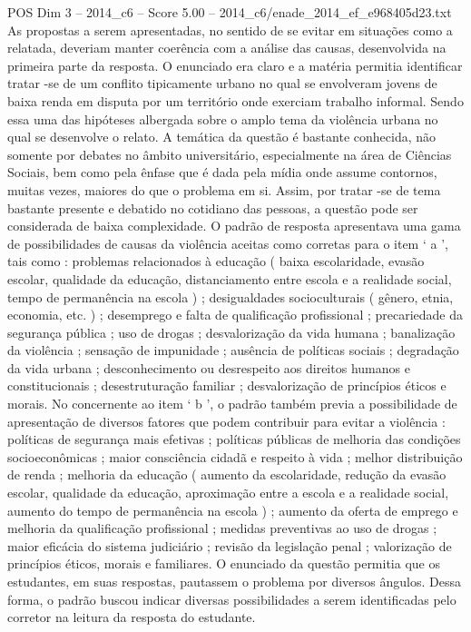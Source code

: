 \begin{textsample}{POS Dim 3 – 2014\_c6 – Score 5.00 – 2014\_c6/enade\_2014\_ef\_e968405d23.txt}
As propostas a serem apresentadas, no sentido de se evitar em situações como a relatada, deveriam manter coerência com a análise das causas, desenvolvida na primeira parte da resposta.
O enunciado era claro e a matéria permitia identificar tratar -se de um conflito tipicamente urbano no qual se envolveram jovens de baixa renda em disputa por um território onde exerciam trabalho informal.
Sendo essa uma das hipóteses albergada sobre o amplo tema da violência urbana no qual se desenvolve o relato.
A temática da questão é bastante conhecida, não somente por debates no âmbito universitário, especialmente na área de Ciências Sociais, bem como pela ênfase que é dada pela mídia onde assume contornos, muitas vezes, maiores do que o problema em si.
Assim, por tratar -se de tema bastante presente e debatido no cotidiano das pessoas, a questão pode ser considerada de baixa complexidade.
O padrão de resposta apresentava uma gama de possibilidades de causas da violência aceitas como corretas para o item ‘ a ’, tais como : problemas relacionados à educação ( baixa escolaridade, evasão escolar, qualidade da educação, distanciamento entre escola e a realidade social, tempo de permanência na escola ) ; desigualdades socioculturais ( gênero, etnia, economia, etc. ) ; desemprego e falta de qualificação profissional ; precariedade da segurança pública ; uso de drogas ; desvalorização da vida humana ; banalização da violência ; sensação de impunidade ; ausência de políticas sociais ; degradação da vida urbana ; desconhecimento ou desrespeito aos direitos humanos e constitucionais ; desestruturação familiar ; desvalorização de princípios éticos e morais.
No concernente ao item ‘ b ’, o padrão também previa a possibilidade de apresentação de diversos fatores que podem contribuir para evitar a violência : políticas de segurança mais efetivas ; políticas públicas de melhoria das condições socioeconômicas ; maior consciência cidadã e respeito à vida ; melhor distribuição de renda ; melhoria da educação ( aumento da escolaridade, redução da evasão escolar, qualidade da educação, aproximação entre a escola e a realidade social, aumento do tempo de permanência na escola ) ; aumento da oferta de emprego e melhoria da qualificação profissional ; medidas preventivas ao uso de drogas ; maior eficácia do sistema judiciário ; revisão da legislação penal ; valorização de princípios éticos, morais e familiares.
O enunciado da questão permitia que os estudantes, em suas respostas, pautassem o problema por diversos ângulos.
Dessa forma, o padrão buscou indicar diversas possibilidades a serem identificadas pelo corretor na leitura da resposta do estudante.

\end{textsample}

